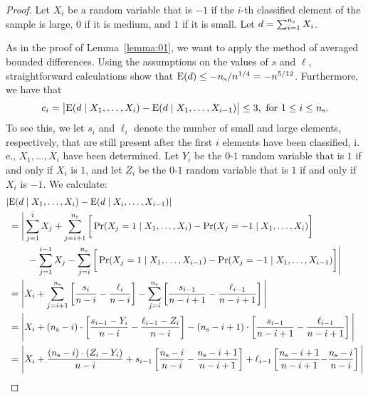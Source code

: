 \documentclass[prodmode,acmtalg]{acmsmall}
\newcommand{\E}{\textnormal{\textrm{E}}}
\newcommand{\Samplesize}{\ensuremath{n_{\textnormal{\textrm{s}}}}}
\begin{document}
\begin{proof}
    Let $X_i$ be a random variable that is $-1$ if
    the $i$-th classified element of the sample is large, $0$ if it is medium, 
    and $1$ if it is small. Let $d = \sum_{i =
    1}^{\Samplesize} X_i$. 

    As in the proof of Lemma~\ref{lemma:01}, we want to apply the method of
    averaged bounded differences. Using the assumptions on the values of $s$ and $\ell$, straightforward
    calculations show that $\E(d) \leq -\Samplesize/n^{1/4} = -n^{5/12}$. Furthermore, we have that 
    \begin{align*}
	c_i = \bigl|\E(d \mid X_1,\ldots,X_i) - \E(d \mid X_1, \ldots, X_{i-1})\bigr| \leq
    3, \text{ for  } 1\leq i \leq \Samplesize.
    \end{align*}
To see this, we let $s_i$ and $\ell_i$ denote the number of small and
    large  elements, respectively, that
    are still present after the first $i$ elements have been classified, i.\,e., $X_1,\ldots,X_i$ have been determined. Let $Y_i$ be the
    $0$-$1$ random variable that is $1$ if and only if $X_i$ is $1$, and let $Z_i$ be the
    $0$-$1$ random variable that is $1$ if and only if $X_i$ is $-1$. 
    We calculate:
    \begin{align*}
        |&\E(d \mid X_1, \ldots, X_i) - \E(d \mid X_i,\ldots, X_{i-1})|\\
    	&= \Bigg| \sum_{j = 1}^i{X_j} + \sum_{j = i+1}^{\Samplesize} \bigg[\Pr(X_j = 1 \mid X_1,
    \ldots, X_i) - \Pr(X_j = -1 \mid X_1,\ldots, X_i)\bigg] \\ &\quad\quad- \sum_{j =
    1}^{i-1}{X_j}- \sum_{j = i}^{\Samplesize} \bigg[\Pr(X_j = 1 \mid X_1,
    \ldots, X_{i-1}) - \Pr(X_j = -1 \mid X_1,\ldots, X_{i-1})\bigg]\Bigg|\\
    &= \Bigg| X_i + \sum_{j = i + 1}^{\Samplesize} \left[\frac{s_i}{n - i} -
    \frac{\ell_i}{n-i}\right] - \sum_{j = i}^{\Samplesize} \left[\frac{s_{i - 1}}{n-i + 1} -
    \frac{\ell_{i - 1}}{n-i+1}\right]\Bigg|\\
    &= \Bigg| X_i + (\Samplesize - i)\cdot  \left[\frac{s_{i-1} - Y_i}{n - i} -
    \frac{\ell_{i-1} - Z_i}{n-i}\right] - (\Samplesize - i +1) \cdot \left[\frac{s_{i - 1}}{n-i + 1} -
    \frac{\ell_{i - 1}}{n-i+1}\right]\Bigg|\\
    &= \Bigg| X_i  + \frac{(\Samplesize-i) \cdot (Z_i - Y_i)}{n-i} + s_{i - 1}
    \left[\frac{\Samplesize-i}{n - i} -
    \frac{\Samplesize-i+1}{n-i+1}\right] + \ell_{i - 1} \left[\frac{\Samplesize - i + 1}{n-i+1} {-}
    \frac{\Samplesize - i}{n-i}\right]\Bigg|\\

\end{align*}
\end{proof}
\end{document}
